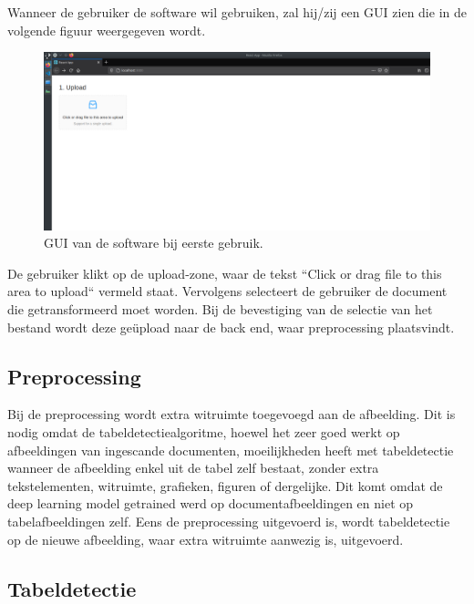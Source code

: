Wanneer de gebruiker de software wil gebruiken, zal hij/zij een GUI zien die in de volgende figuur weergegeven wordt.

\begin{figure}[H]
    \centering
    \includegraphics[width=1\textwidth]{img/gui_screenshot_not_used.png}
    \caption{GUI van de software bij eerste gebruik.}
    \label{fig:gui-screenshot-not-used}
\end{figure}

De gebruiker klikt op de upload-zone, waar de tekst ``Click or drag file to this area to upload`` vermeld staat. Vervolgens selecteert de gebruiker de document die getransformeerd moet worden. Bij de bevestiging van de selectie van het bestand wordt deze geüpload naar de back end, waar preprocessing plaatsvindt.

\subsection{Preprocessing}
\label{subsec:preprocessing}

Bij de preprocessing wordt extra witruimte toegevoegd aan de afbeelding. Dit is nodig omdat de tabeldetectiealgoritme, hoewel het zeer goed werkt op afbeeldingen van ingescande documenten, moeilijkheden heeft met tabeldetectie wanneer de afbeelding enkel uit de tabel zelf bestaat, zonder extra tekstelementen, witruimte, grafieken, figuren of dergelijke. Dit komt omdat de deep learning model getrained werd op documentafbeeldingen en niet op tabelafbeeldingen zelf. Eens de preprocessing uitgevoerd is, wordt tabeldetectie op de nieuwe afbeelding, waar extra witruimte aanwezig is, uitgevoerd.

\subsection{Tabeldetectie}
\label{subsec:tabel-detectie}

